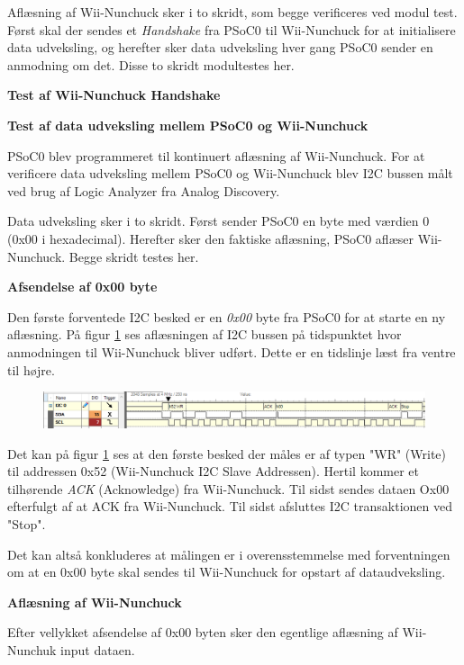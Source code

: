Aflæsning af Wii-Nunchuck sker i to skridt, som begge verificeres ved modul test. Først skal der sendes et \textit{Handshake} fra PSoC0 til Wii-Nunchuck for at initialisere data udveksling, og herefter sker data udveksling hver gang PSoC0 sender en anmodning om det. Disse to skridt modultestes her.

\textbf{Test af Wii-Nunchuck Handshake}

\textbf{Test af data udveksling mellem PSoC0 og Wii-Nunchuck} 

PSoC0 blev programmeret til kontinuert aflæsning af Wii-Nunchuck. For at verificere data udveksling mellem PSoC0 og Wii-Nunchuck blev I2C bussen målt ved brug af Logic Analyzer fra Analog Discovery.

Data udveksling sker i to skridt. Først sender PSoC0 en byte med værdien 0 (0x00 i hexadecimal). Herefter sker den faktiske aflæsning, PSoC0 aflæser Wii-Nunchuck. Begge skridt testes her.

\textbf{Afsendelse af 0x00 byte}

Den første forventede I2C besked er en \textit{0x00} byte fra PSoC0 for at starte en ny aflæsning. På figur \ref{fig:NunchuckWriteValues} ses aflæsningen af I2C bussen på tidspunktet hvor anmodningen til Wii-Nunchuck bliver udført. Dette er en tidslinje læst fra ventre til højre.

\begin{figure}[H]
	\centering
	\includegraphics[width=\textwidth]{Test/images/writerequest}
	\caption{}
	\label{fig:NunchuckWriteValues}
\end{figure}

Det kan på figur \ref{fig:NunchuckWriteValues} ses at den første besked der måles er af typen "WR" (Write) til addressen 0x52 (Wii-Nunchuck I2C Slave Addressen). Hertil kommer et tilhørende \textit{ACK} (Acknowledge) fra Wii-Nunchuck. Til sidst sendes dataen Ox00 efterfulgt af at ACK fra Wii-Nunchuck. Til sidst afsluttes I2C transaktionen ved "Stop".

Det kan altså konkluderes at målingen er i overensstemmelse med forventningen om at en 0x00 byte skal sendes til Wii-Nunchuck for opstart af dataudveksling.

\textbf{Aflæsning af Wii-Nunchuck}

Efter vellykket afsendelse af 0x00 byten sker den egentlige aflæsning af Wii-Nunchuk input dataen.

